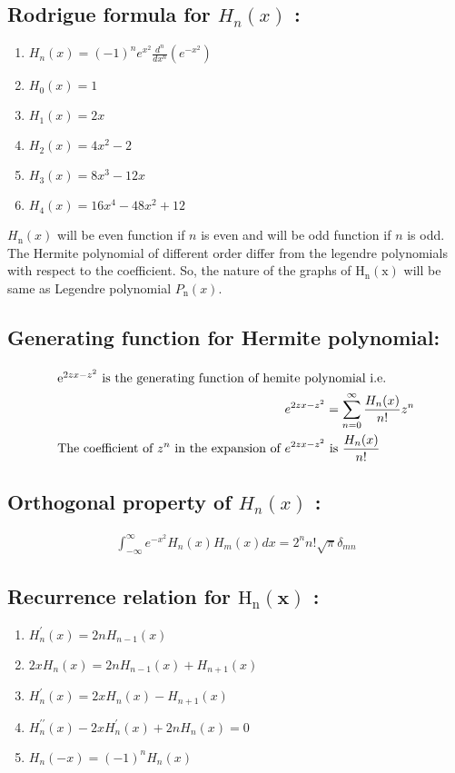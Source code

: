 \subsection{Rodrigue formula for $H_{n}(x)$ :}
\begin{enumerate}
	\item $H_{n}(x)=(-1)^{n} e^{x^{2}} \frac{d^{n}}{d x^{n}}\left(e^{-x^{2}}\right) $
	\item $ H_{0}(x)=1  $
	\item $ H_{1}(x)=2 x  $
	\item $ H_{2}(x)=4 x^{2}-2 $
	\item $ H_{3}(x)=8 x^{3}-12 x$
	\item $ H_{4}(x)=16 x^{4}-48 x^{2}+12$
\end{enumerate}
$H_{\mathrm{n}}(x)$ will be even function if $n$ is even and will be odd function if $n$ is odd.
The Hermite polynomial of different order differ from the legendre polynomials with respect to the coefficient.
 So, the nature of the graphs of $\mathrm{H}_{\mathrm{n}}(\mathrm{x})$ will be same as Legendre polynomial $P_{\mathrm{n}}(x)$.
\subsection{Generating function for Hermite polynomial:}
\begin{align*}
\intertext{$\mathrm{e}^{2 {zx}-{z}^{2}}$ is the generating function of hemite polynomial i.e.}
e^{2 z x-z^{2}}&=\sum_{n=0}^{\infty} \frac{H_{n}(x)}{n !} z^{n}\\
\text{The coefficient of $z^{n}$ in the expansion of }e^{2 z x-z^{2}}&\text{ is } \frac{H_{n}(x)}{n !}
\end{align*}
\subsection{Orthogonal property of $H_{n}(x)$ :}
\begin{align*}
\int_{-\infty}^{\infty} e^{-x^{2}} H_{n}(x) H_{m}(x) d x=2^{n} n ! \sqrt{\pi} \delta_{m n}
\end{align*}
\subsection{Recurrence relation for $\mathrm{H}_{\mathrm{n}}(\mathbf{x})$ :}
\begin{enumerate}
	\item $ H_{n}^{\prime}(x)=2 n H_{n-1}(x)$
	\item $ 2 x H_{n}(x)=2 n H_{n-1}(x)+H_{n+1}(x)$
	\item $H_{n}^{\prime}(x)=2 x H_{n}(x)-H_{n+1}(x)$
	\item $ H_{n}^{\prime \prime}(x)-2 x H_{n}^{\prime}(x)+2 n H_{n}(x)=0$
	\item $  H_{n}(-x)=(-1)^{n} H_{n}(x)$
\end{enumerate}


